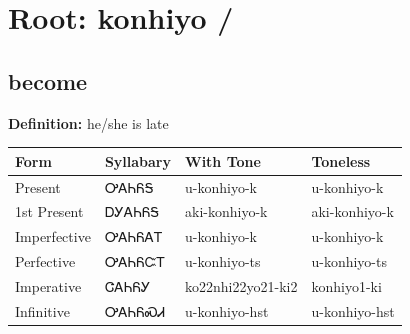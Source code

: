 \documentclass{article}%
\begin{document}
%
\normalsize%
\section*{Root: konhiyo / }%
\subsection*{become}%
\textbf{Definition: }%
he/she is late%
\\[0.5em]%
\begin{tabular}{|l|l|l|l|}%
\hline%
\textbf{Form}&\textbf{Syllabary}&\textbf{With Tone}&\textbf{Toneless}\\%
\hline%
Present&ᎤᎪᏂᏲᎦ&u{-}konhiyo{-}k&u{-}konhiyo{-}k\\%
1st Present&ᎠᎩᎪᏂᏲᎦ&aki{-}konhiyo{-}k&aki{-}konhiyo{-}k\\%
Imperfective&ᎤᎪᏂᏲᎪᎢ&u{-}konhiyo{-}k&u{-}konhiyo{-}k\\%
Perfective&ᎤᎪᏂᏲᏨᎢ&u{-}konhiyo{-}ts&u{-}konhiyo{-}ts\\%
Imperative&ᏣᎪᏂᏲᎩ&ko22nhi22yo21{-}ki2&konhiyo1{-}ki\\%
Infinitive&ᎤᎪᏂᏲᏍᏗ&u{-}konhiyo{-}hst&u{-}konhiyo{-}hst\\%
\hline%
\end{tabular}%
\\[1em]%
\end{document}
